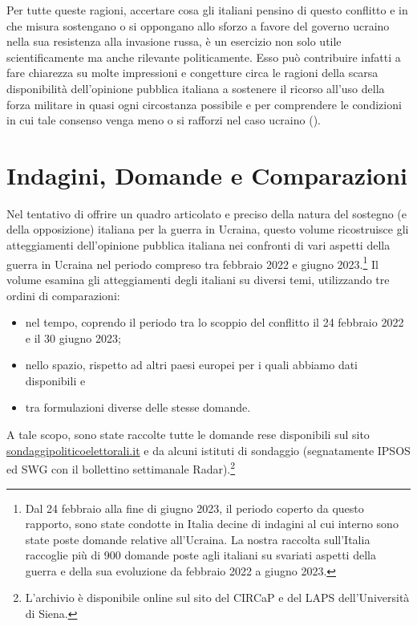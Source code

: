 \documentclass[
  openany]{book}
\begin{document}
Per tutte queste ragioni, accertare cosa gli italiani pensino di questo conflitto e in che misura sostengano o si oppongano allo sforzo a favore del governo ucraino nella sua resistenza alla invasione russa, è un esercizio non solo utile scientificamente ma anche rilevante politicamente. Esso può contribuire infatti a fare chiarezza su molte impressioni e congetture circa le ragioni della scarsa disponibilità dell'opinione pubblica italiana a sostenere il ricorso all'uso della forza militare in quasi ogni circostanza possibile e per comprendere le condizioni in cui tale consenso venga meno o si rafforzi nel caso ucraino (\citet{Everts-e-Isernia2015}).

\hypertarget{indagini-domande-e-comparazioni}{%
\section{Indagini, Domande e Comparazioni}\label{indagini-domande-e-comparazioni}}

Nel tentativo di offrire un quadro articolato e preciso della natura del sostegno (e della opposizione) italiana per la guerra in Ucraina, questo volume ricostruisce gli atteggiamenti dell'opinione pubblica italiana nei confronti di vari aspetti della guerra in Ucraina nel periodo compreso tra febbraio 2022 e giugno 2023.\footnote{Dal 24 febbraio alla fine di giugno 2023, il periodo coperto da questo rapporto, sono state condotte in Italia decine di indagini al cui interno sono state poste domande relative all'Ucraina. La nostra raccolta sull'Italia raccoglie più di 900 domande poste agli italiani su svariati aspetti della guerra e della sua evoluzione da febbraio 2022 a giugno 2023.} Il volume esamina gli atteggiamenti degli italiani su diversi temi, utilizzando tre ordini di comparazioni:

\begin{itemize}
\item
  nel tempo, coprendo il periodo tra lo scoppio del conflitto il 24 febbraio 2022 e il 30 giugno 2023;
\item
  nello spazio, rispetto ad altri paesi europei per i quali abbiamo dati disponibili e
\item
  tra formulazioni diverse delle stesse domande.
\end{itemize}

A tale scopo, sono state raccolte tutte le domande rese disponibili sul sito \href{http://www.sondaggipoliticoelettorali.it/}{sondaggipoliticoelettorali.it} e da alcuni istituti di sondaggio (segnatamente IPSOS ed SWG con il bollettino settimanale Radar).\footnote{L'archivio è disponibile online sul sito del CIRCaP e del LAPS dell'Università di Siena.}
\end{document}
